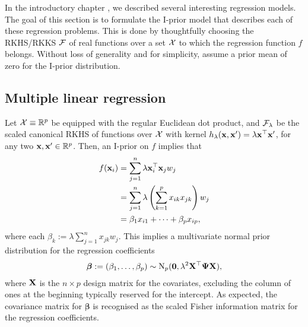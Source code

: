 In the introductory chapter , we described several interesting regression models.
The goal of this section is to formulate the I-prior model that describes each of these regression problems.
This is done by thoughtfully choosing the RKHS/RKKS ${\mathcal F}$ of real functions over a set ${\mathcal X}$ to which the regression function $f$ belongs.
Without loss of generality and for simplicity, assume a prior mean of zero for the I-prior distribution.

\subsection{Multiple linear regression}

Let ${\mathcal X}\equiv \mathbb{R}^p$ be equipped with the regular Euclidean dot product, and ${\mathcal F}_\lambda$ be the scaled canonical RKHS of functions over ${\mathcal X}$ with kernel $h_\lambda({\mathbf x},{\mathbf x}') = \lambda {\mathbf x}^\top{\mathbf x}'$, for any two ${\mathbf x},{\mathbf x}'\in\mathbb{R}^p$. 
Then, an I-prior on $f$ implies that 
\begin{align*}
  f({\mathbf x}_i) &= \sum_{j=1}^n \lambda {\mathbf x}_i^\top{\mathbf x}_j w_j \\
  &= \sum_{j=1}^n \lambda \left( \sum_{k=1}^p x_{ik}x_{jk} \right) w_j \\
  &= \beta_1 x_{i1} + \dots + \beta_p x_{ip},
\end{align*}
where each $\beta_k := \lambda \sum_{j=1}^n  x_{jk}w_j$.
This implies a multivariate normal prior distribution for the regression coefficients   
\begin{align}\label{eq:ipriorcanonical}
  \boldsymbol\beta := (\beta_1,\dots,\beta_p) \sim \operatorname{N}_p({\mathbf 0}, \lambda^2 {\mathbf X}^\top {\bm\Psi} {\mathbf X}),
\end{align}
where ${\mathbf X}$ is the $n \times p$ design matrix for the covariates, excluding the column of ones at the beginning typically reserved for the intercept. 
As expected, the covariance matrix for $\boldsymbol\beta$ is recognised as the scaled Fisher information matrix for the regression coefficients.

